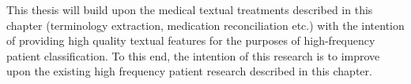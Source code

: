 This thesis will build upon the medical textual treatments described in this chapter (terminology extraction, medication reconciliation etc.) with the intention of providing high quality textual features for the purposes of high-frequency patient classification. To this end, the intention of this research is to improve upon the existing high frequency patient research described in this chapter.  